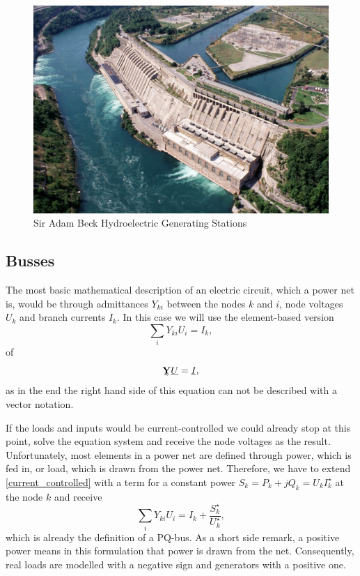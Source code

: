 \begin{figure}
	\includegraphics[width=\textwidth]{figures/adam_beck_complex.jpg}
	\caption{Sir Adam Beck Hydroelectric Generating Stations \citep{adam_back_complex}}
	\label{fig:power_plant}
\end{figure}

\subsection{Busses}

The most basic mathematical description of an electric circuit, which a power net is, would be through admittances $Y_{ki}$ between the nodes $k$ and $i$, node voltages $U_k$ and branch currents $I_k$. In this case we will use the element-based version
\begin{equation}
	\sum_i Y_{ki} U_i = I_k,
	\label{eq:current_controlled}
\end{equation}
of
\begin{equation}
	\mat Y \vec U = \vec I,
\end{equation}
as in the end the right hand side of this equation can not be described with a vector notation.

If the loads and inputs would be current-controlled we could already stop at this point, solve the equation system and receive the node voltages as the result. Unfortunately, most elements in a power net are defined through power, which is fed in, or load, which is drawn from the power net. Therefore, we have to extend \eqref{current_controlled} with a term for a constant power $S_k = P_k + j Q_k = U_k I_k^\star$ at the node $k$ and receive
\begin{equation}
	\sum_i Y_{ki} U_i = I_k + \frac{S_k^\star}{U_k^\star},
	\label{eq:pq_bus}
\end{equation}
which is already the definition of a PQ-bus. As a short side remark, a positive power means in this formulation that power is drawn from the net. Consequently, real loads are modelled with a negative sign and generators with a positive one.

